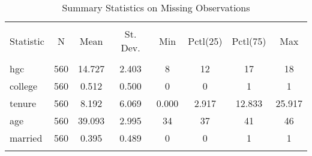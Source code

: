 \documentclass{article}
\begin{document}
\begin{table}[!htbp] \centering 
  \caption{Summary Statistics on Missing Observations} 
  \label{} 
\begin{tabular}{@{\extracolsep{5pt}}lccccccc} 
\\[-1.8ex]\hline 
\hline \\[-1.8ex] 
Statistic & \multicolumn{1}{c}{N} & \multicolumn{1}{c}{Mean} & \multicolumn{1}{c}{St. Dev.} & \multicolumn{1}{c}{Min} & \multicolumn{1}{c}{Pctl(25)} & \multicolumn{1}{c}{Pctl(75)} & \multicolumn{1}{c}{Max} \\ 
\hline \\[-1.8ex] 
hgc & 560 & 14.727 & 2.403 & 8 & 12 & 17 & 18 \\ 
college & 560 & 0.512 & 0.500 & 0 & 0 & 1 & 1 \\ 
tenure & 560 & 8.192 & 6.069 & 0.000 & 2.917 & 12.833 & 25.917 \\ 
age & 560 & 39.093 & 2.995 & 34 & 37 & 41 & 46 \\ 
married & 560 & 0.395 & 0.489 & 0 & 0 & 1 & 1 \\ 
\hline \\[-1.8ex] 
\end{tabular} 
\end{table} 
\end{document}
